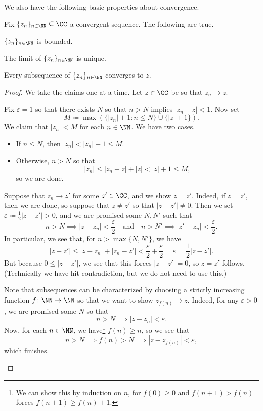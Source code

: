 \documentclass[../notes.tex]{subfiles}
\begin{document}
We also have the following basic properties about convergence.
\begin{proposition}
	Fix $\{z_n\}_{n\in\NN}\subseteq\CC$ a convergent sequence. The following are true.
	\begin{listalph}
		\item $\{z_n\}_{n\in\NN}$ is bounded.
		\item The limit of $\{z_n\}_{n\in\NN}$ is unique.
		\item Every subsequence of $\{z_n\}_{n\in\NN}$ converges to $z$.
	\end{listalph}
\end{proposition}
\begin{proof}
	We take the claims one at a time. Let $z\in\CC$ be so that $z_n\to z$.
	\begin{listalph}
		\item Fix $\varepsilon=1$ so that there exists $N$ so that $n>N$ implies $|z_n-z|<1$. Now set
		\[M\coloneqq \max(\{|z_n|+1:n\le N\}\cup\{|z|+1\}).\]
		We claim that $|z_n|<M$ for each $n\in\NN$. We have two cases.
		\begin{itemize}
			\item If $n\le N$, then $|z_n|<|z_n|+1\le M$.
			\item Otherwise, $n>N$ so that
			\[|z_n|\le|z_n-z|+|z|<|z|+1\le M,\]
			so we are done.
		\end{itemize}

		\item Suppose that $z_n\to z'$ for some $z'\in\CC$, and we show $z=z'$. Indeed, if $z=z'$, then we are done, so suppose that $z\ne z'$ so that $|z-z'|\ne0$. Then we set $\varepsilon\coloneqq \frac12|z-z'|>0$, and we are promised some $N,N'$ such that
		\[n>N\implies|z-z_n|<\frac\varepsilon2\quad\text{and}\quad n>N'\implies|z'-z_n|<\frac\varepsilon2.\]
		In particular, we see that, for $n>\max\{N,N'\}$, we have
		\[|z-z'|\le|z-z_n|+|z_n-z'|<\frac\varepsilon2+\frac\varepsilon2=\varepsilon=\frac12|z-z'|.\]
		But because $0\le|z-z'|$, we see that this forces $|z-z'|=0$, so $z=z'$ follows. (Technically we have hit contradiction, but we do not need to use this.)

		\item Note that subsequences can be characterized by choosing a strictly increasing function $f\colon\NN\to\NN$ so that we want to show $z_{f(n)}\to z$. Indeed, for any $\varepsilon>0$, we are promised some $N$ so that
		\[n>N\implies|z-z_n|<\varepsilon.\]
		Now, for each $n\in\NN$, we have\footnote{We can show this by induction on $n$, for $f(0)\ge0$ and $f(n+1)>f(n)$ forces $f(n+1)\ge f(n)+1$.} $f(n)\ge n$, so we see that
		\[n>N\implies f(n)>N\implies|z-z_{f(n)}|<\varepsilon,\]
		which finishes.
		\qedhere
	\end{listalph}
\end{proof}
\end{document}
